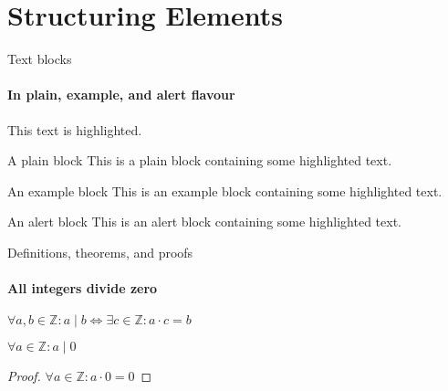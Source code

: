 \section{Structuring Elements}

\begin{frame}{Text blocks}
\framesubtitle{In plain, example, and \alert{alert} flavour}
\alert{This text} is highlighted.

\begin{block}{A plain block}
    This is a plain block containing some \alert{highlighted text}.
\end{block}

\begin{exampleblock}{An example block}
    This is an example block containing some \alert{highlighted text}.
\end{exampleblock}

\begin{alertblock}{An alert block}
    This is an alert block containing some \alert{highlighted text}.
\end{alertblock}
\end{frame}

 \begin{frame}[label=proof]{Definitions, theorems, and proofs}
\framesubtitle{All integers divide zero}
\begin{definition}
    $\forall a,b\in\mathbb{Z}: a\mid b\iff\exists c\in\mathbb{Z}:a\cdot c=b$
\end{definition}

\begin{theorem}
    $\forall a\in\mathbb{Z}: a\mid 0$
\end{theorem}

\begin{proof}
    $\forall a\in\mathbb{Z}: a\cdot 0=0$
\end{proof}
\end{frame}
